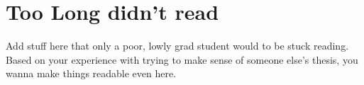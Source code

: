 \cleardoublepage
\chapter{Too Long didn't read}
\label{Appendix:tldr1}

  Add stuff here that only a poor, lowly grad student would to be stuck reading. 
  Based on your experience with trying to make sense of someone else's thesis, you wanna make
  things readable even here.
   
